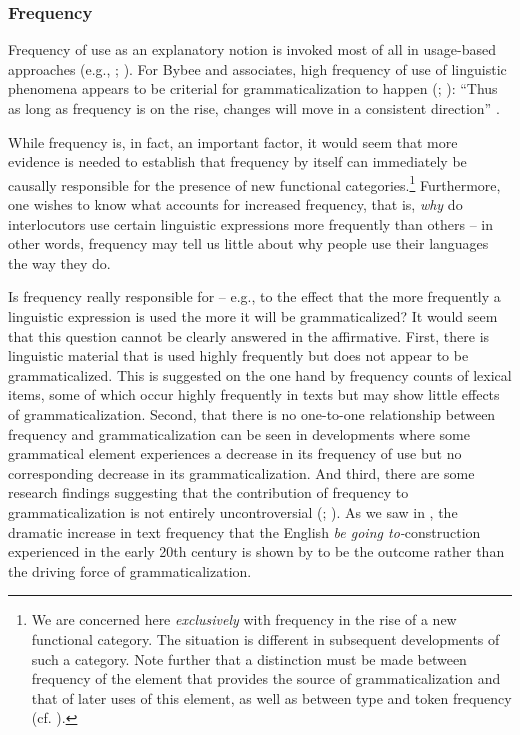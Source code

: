 \documentclass[output=paper]{langsci/langscibook}
\begin{document}
\subsubsection{Frequency}\label{sec:heine:4.1.7}



Frequency of use as an explanatory notion is invoked most of all in usage-based approaches (e.g., \citealt{Bybee2011}; \citealt[225]{Torres2011}). For Bybee and associates, high frequency of use of linguistic phenomena appears to be criterial for grammaticalization to happen (\citealt{Bybee2003}; \citeyear{Bybee2006}): “Thus as long as frequency is on the rise, changes will move in a consistent direction” \citep[77]{Bybee2011}.



While frequency is, in fact, an important factor, it would seem that more evidence is needed to establish that frequency by itself can immediately be causally responsible for the presence of new functional categories.\footnote{We are concerned here \textit{exclusively} with frequency in the rise of a new functional category. The situation is different in subsequent developments of such a category. Note further that a distinction must be made between frequency of the element that provides the source of grammaticalization and that of later uses of this element, as well as between type and token frequency (cf. \citealt[244]{Mair2011}).}  Furthermore, one wishes to know what accounts for increased frequency, that is, \textit{why} do interlocutors use certain linguistic expressions more frequently than others -- in other words, frequency may tell us little about why people use their languages the way they do.



  Is frequency really responsible for  -- e.g., to the effect that the more frequently a linguistic expression is used the more it will be grammaticalized? It would seem that this question cannot be clearly answered in the affirmative. First, there is linguistic material that is used highly frequently but does not appear to be grammaticalized. This is suggested on the one hand by frequency counts of lexical items, some of which occur highly frequently in texts but may show little effects of grammaticalization. Second, that there is no one-to-one relationship between frequency and grammaticalization can be seen in developments where some grammatical element experiences a decrease in its frequency of use but no corresponding decrease in its grammaticalization. And third, there are some research findings suggesting that the contribution of frequency to grammaticalization is not entirely uncontroversial (\citealt{Hoffmann2004,Hoffmann2005,Brems2007,Mair2011};  \citealt[10]{Hilpert2013}). As we saw in , the dramatic increase in text frequency that the English \textit{be going to-}construction experienced in the early 20th century is shown by \citet[129]{Mair2004} to be the outcome rather than the driving force of grammaticalization.
\end{document}

